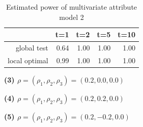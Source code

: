 \documentclass[12pt]{report}
\begin{document}
\begin{table}[ht]
\centering
\begin{tabular}{rrrrr}
  \hline
 & t=1 & t=2 & t=5 & t=10 \\ 
  \hline
global test & 0.64 & 1.00 & 1.00 & 1.00 \\ 
  local optimal & 0.99 & 1.00 & 1.00 & 1.00 \\ 
   \hline
\end{tabular}
\caption{Estimated power of multivariate attribute model 2}
\end{table}

\textbf{(3) $\rho = (\rho_{1}, \rho_{2}, \rho_{3}) = (0.2, 0.0, 0.0)$}

\textbf{(4) $\rho = (\rho_{1}, \rho_{2}, \rho_{3}) = (0.2, 0.2, 0.0)$}

\newpage
\textbf{(5) $\rho = (\rho_{1}, \rho_{2}, \rho_{3}) = (0.2, -0.2, 0.0)$}
\end{document}

